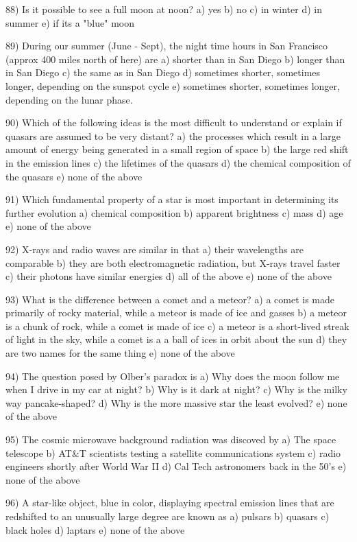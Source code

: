 88) Is it possible to see a full moon at noon?
a) yes b) no c) in winter d) in summer e) if its a "blue" moon

89) During our summer (June - Sept), the night time hours in San Francisco
(approx 400 miles north of here) are
a) shorter than in San Diego
b) longer than in San Diego
c) the same as in San Diego
d) sometimes shorter, sometimes longer, depending on the sunspot cycle
e) sometimes shorter, sometimes longer, depending on the lunar phase.

90) Which of the following ideas is the most difficult to understand or explain
if quasars are assumed to be very distant?
a) the processes which result in a large amount of energy being generated
in a small region of space
b) the large red shift in the emission lines
c) the lifetimes of the quasars
d) the chemical composition of the quasars
e) none of the above

91) Which fundamental property of a star is most important in determining
its further evolution
a) chemical composition b) apparent brightness
c) mass d) age e) none of the above

92) X-rays and radio waves are similar in that
a) their wavelengths are comparable
b) they are both electromagnetic radiation, but X-rays travel faster
c) their photons have similar energies
d) all of the above
e) none of the above

93) What is the difference between a comet and a meteor?
a) a comet is made primarily of rocky material, while a meteor
is made of ice and gasses
b) a meteor is a chunk of rock, while a comet is made of ice
c) a meteor is a short-lived streak of light in the sky, while
a comet is a a ball of ices in orbit about the sun
d) they are two names for the same thing
e) none of the above

94) The question posed by Olber's paradox is
a) Why does the moon follow me when I drive in my car at night?
b) Why is it dark at night?
c) Why is the milky way pancake-shaped?
d) Why is the more massive star the least evolved?
e) none of the above

95) The cosmic microwave background radiation was discoved by
a) The space telescope
b) AT&T scientists testing a satellite communications system
c) radio engineers shortly after World War II
d) Cal Tech astronomers back in the 50's
e) none of the above

96) A star-like object, blue in color, displaying spectral emission lines
that are redshifted to an unusually large degree are known as
a) pulsars b) quasars c) black holes d) laptars e) none of the above

